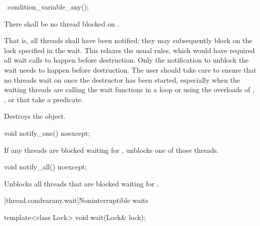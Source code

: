 %
\begin{itemdecl}
~condition_variable_any();
\end{itemdecl}

\begin{itemdescr}
\pnum
\requires There shall be no thread blocked on . \begin{note} That is, all
threads shall have been notified; they may subsequently block on the lock specified in the
wait.
This relaxes the usual rules, which would have required all wait calls to happen before
destruction. Only the notification to unblock the wait needs to happen before destruction.
The user should take care to ensure that no threads wait on  once the destructor has
been started, especially when the waiting threads are calling the wait functions in a loop or
using the overloads of , , or  that take a predicate.
\end{note}

\pnum\effects Destroys the object.
\end{itemdescr}

%
\begin{itemdecl}
void notify_one() noexcept;
\end{itemdecl}

\begin{itemdescr}
\pnum\effects If any threads are blocked waiting for , unblocks one of those threads.
\end{itemdescr}

%
\begin{itemdecl}
void notify_all() noexcept;
\end{itemdecl}

\begin{itemdescr}
\pnum\effects Unblocks all threads that are blocked waiting for .
\end{itemdescr}

[thread.condvarany.wait]{Noninterruptible waits}

%
\begin{itemdecl}
template<class Lock>
  void wait(Lock& lock);
\end{itemdecl}

